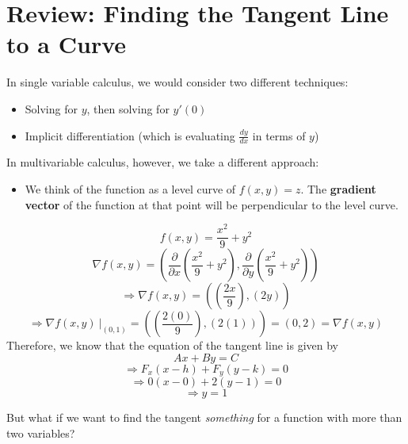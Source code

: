 \documentclass{report}
\begin{document}
\begin{sloppypar}
\section{Review: Finding the Tangent Line to a Curve}
\sol
In single variable calculus, we would consider
two different techniques:
\begin{itemize}
  \item Solving for $ y $, then solving for $ y'(0) $
  \item Implicit differentiation (which is
        evaluating $\frac{dy}{dx}$ in terms of $ y $)
\end{itemize}

In multivariable calculus, however, we take a
different approach:
\begin{itemize}
  \item We think of the function as a level curve of
        $ f(x,y) = z $. The \textbf{gradient
        vector} of the function at that point
        will be perpendicular to the level curve.
\end{itemize}


\[ f(x,y) = \frac{x^{2}}{9} + y^{2}\]
\[ \nabla f(x,y) = \left( \frac{\partial}{\partial x} \left( \frac{x^{2}}{9} + y^{2} \right),
    \frac{\partial}{\partial y} \left( \frac{x^{2}}{9} + y^{2} \right)\right)\]
\[ \Rightarrow \nabla f(x,y) = \left( \left( \frac{2x}{9} \right),
    \left( 2y \right) \right)\]
\[ \Rightarrow \nabla f(x,y) ~\Big |_{(0,1)} =
  \left( \left( \frac{2(0)}{9} \right), \left( 2(1) \right) \right) = \left( 0,2 \right) = \nabla f(x,y)\]
Therefore, we know that the equation of the
tangent line is given by
\[ Ax + By = C \]
\[ \Rightarrow F_{x}(x-h) + F_{y}(y-k) = 0 \]
\[ \Rightarrow 0 \left( x-0 \right) + 2 \left( y-1 \right) = 0 \]
\[ \Rightarrow y = 1 \]

But what if we want to find the tangent \textit{something} for a function with more than
two variables?


\end{sloppypar}
\end{document}
